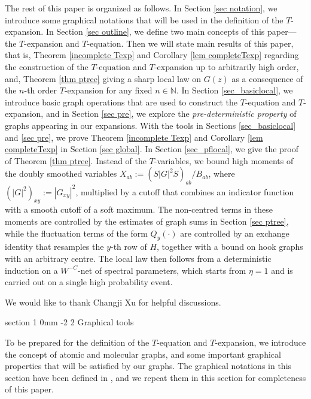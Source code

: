 \documentclass{article}
\makeatletter
\newcommand{\1}{\mathds{1}}
\numberwithin{equation}{section}
\newcommand{\N}{\mathbb{N}}
\theoremstyle{plain} %
\theoremstyle{remark}
\newcommand{\incomp}{{\text{$T$-equation}}}
\renewcommand{\section}{\@startsection
	{section}%
	{1}%
	{0mm}%
	{-2\baselineskip}%
	{2\baselineskip}%
	{\normalfont\large\scshape\centering}} %
\makeatother
\begin{document}
The rest of this paper is organized as follows. In Section \ref{sec notation}, we introduce some graphical notations that will be used in the definition of the $T$-expansion. In Section \ref{sec outline}, we define two main concepts of this paper---the $T$-expansion and $\incomp$. Then we will state main results of this paper, that is, Theorem \ref{incomplete Texp} and Corollary \ref{lem completeTexp} regarding the construction of the $\incomp$ and $T$-expansion up to arbitrarily high order, and, Theorem \ref{thm ptree} giving a sharp local law on $G(z)$ as a consequence of the $n$-th order $T$-expansion for any fixed $n\in \N$. In Section \ref{sec_basiclocal}, we introduce basic graph operations that are used to construct the $\incomp$ and $T$-expansion, and in Section \ref{sec pre}, we explore the \emph{pre-deterministic property} of graphs appearing in our expansions. With the tools in Sections \ref{sec_basiclocal} and \ref{sec pre}, we prove Theorem \ref{incomplete Texp} and Corollary \ref{lem completeTexp} in Section \ref{sec global}. In Section \ref{sec_pflocal}, we give the proof of Theorem \ref{thm ptree}. Instead of the $T$-variables, we bound high moments of the doubly smoothed variables $X_{ab}:=(S|G|^2S)_{ab}/B_{ab}$, where $(|G|^2)_{xy}:=|G_{xy}|^2$, multiplied by a cutoff that combines an indicator function with a smooth cutoff of a soft maximum. The non-centred terms in these moments are controlled by the estimates of graph sums in Section \ref{sec ptree}, while the fluctuation terms of the form $Q_y(\cdot)$ are controlled by an exchange identity that resamples the $y$-th row of $H$, together with a bound on hook graphs with an arbitrary centre. The local law then follows from a deterministic induction on a $W^{-C}$-net of spectral parameters, which starts from $\eta=1$ and is carried out on a single high probability event.


\medskip
{} We would like to thank Changji Xu for helpful discussions.

\section{Graphical tools}\label{sec notation}

To be prepared for the definition of the $\incomp$ and $T$-expansion, we introduce the concept of atomic and molecular graphs, and some important graphical properties that will be satisfied by our graphs. The graphical notations in this section have been defined in \cite{PartI_high}, and we repeat them in this section for completeness of this paper. 
\end{document}
